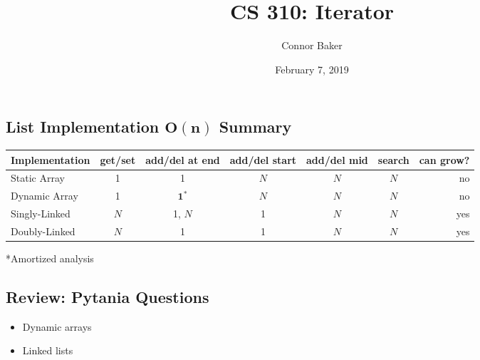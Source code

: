 \documentclass[10pt]{article}
\title{CS 310: Iterator}
\author{Connor Baker}
\date{February 7, 2019}
\begin{document}
\maketitle

\subsection*{List Implementation $\mathbf{O(n)}$ Summary}
\begin{center}
    \begin{tabular}{lcccccr} \toprule
        Implementation & get/set & add/del at end & add/del start & add/del mid & search & can grow? \\ \midrule
        Static Array & 1 & 1 & $N$ & $N$ & $N$ & no \\
        Dynamic Array & 1 & $\mathbf{1^*}$ & $N$ & $N$ & $N$ & no \\     Singly-Linked & $N$ & 1, $N$ & 1 & $N$ & $N$ & yes \\
        Doubly-Linked & $N$ & 1 & 1 & $N$ & $N$ & yes \\ \bottomrule
    \end{tabular}
    \begin{center}*Amortized analysis\end{center}
\end{center}


\subsection*{Review: Pytania Questions}
\begin{itemize}
    \item Dynamic arrays
    \item Linked lists
\end{itemize}
\end{document}
